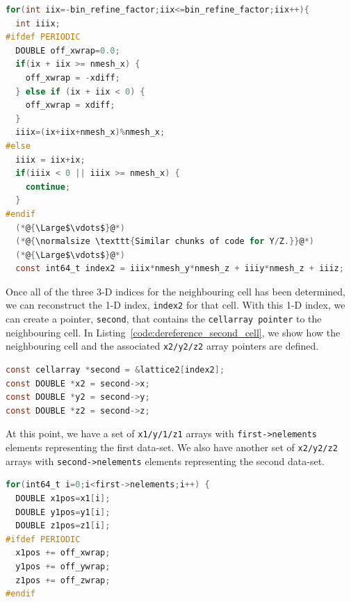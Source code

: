 \documentclass[12pt,titlepage,justified]{article}
\begin{document}
\begin{lstlisting}[language=C,numbers=none,label={code:looping_over_neighbouring_cells},caption={Looping over all the neighbouring cells and taking care 
of PERIODIC boundary conditions},basicstyle=\scriptsize]
for(int iix=-bin_refine_factor;iix<=bin_refine_factor;iix++){
  int iiix;
#ifdef PERIODIC
  DOUBLE off_xwrap=0.0;
  if(ix + iix >= nmesh_x) {
    off_xwrap = -xdiff;
  } else if (ix + iix < 0) {
    off_xwrap = xdiff;
  }
  iiix=(ix+iix+nmesh_x)%nmesh_x;
#else
  iiix = iix+ix;
  if(iiix < 0 || iiix >= nmesh_x) {
    continue;
  }
#endif
  (*@{\Large$\vdots$}@*)
  (*@{\normalsize \texttt{Similar chunks of code for Y/Z.}}@*)
  (*@{\Large$\vdots$}@*)
  const int64_t index2 = iiix*nmesh_y*nmesh_z + iiiy*nmesh_z + iiiz;
\end{lstlisting}
Once all of the three 3-D indices for the neighbouring cell has been determined, we can reconstruct the 1-D index, \texttt{index2} for that cell. With this 1-D index, we can 
create a pointer, \texttt{second}, that contains the \texttt{cellarray pointer} to the neighbouring cell. In Listing~\ref{code:dereference_second_cell}, we show 
how the neighbouring cell and the associated \texttt{x2/y2/z2} array pointers are defined. 
\begin{lstlisting}[language=C,numbers=none,label={code:dereference_second_cell},caption={Dereferencing the pointers for the neighbouring (\texttt{second}) cell under consideration.},basicstyle=\scriptsize]
const cellarray *second = &lattice2[index2];
const DOUBLE *x2 = second->x;
const DOUBLE *y2 = second->y;
const DOUBLE *z2 = second->z;
\end{lstlisting}
At this point, we have a set of \texttt{x1/y/1/z1} arrays with \texttt{first->nelements} elements representing the first data-set. We also have another set of \texttt{x2/y2/z2} arrays with \texttt{second->nelements} 
elements representing the second data-set. 

\begin{lstlisting}[language=C,numbers=none,label={code:looping_over_first_particles},caption={Looping over all particles in the \texttt{first} cell and accounting for PERIODIC boundary conditions.},basicstyle=\scriptsize]
for(int64_t i=0;i<first->nelements;i++) {
  DOUBLE x1pos=x1[i];
  DOUBLE y1pos=y1[i];
  DOUBLE z1pos=z1[i];
#ifdef PERIODIC
  x1pos += off_xwrap;
  y1pos += off_ywrap;
  z1pos += off_zwrap;
#endif
\end{lstlisting}
\end{document}
